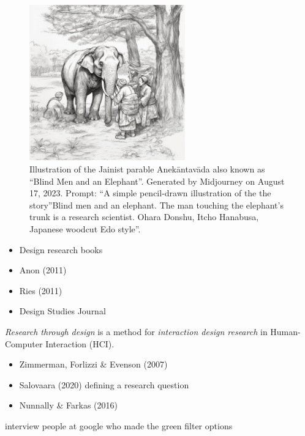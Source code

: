 \documentclass[
  letterpaper,
  DIV=11,
  numbers=noendperiod]{scrartcl}
\providecommand{\tightlist}{%
  \setlength{\itemsep}{0pt}\setlength{\parskip}{0pt}}\usepackage{longtable,booktabs,array}
\begin{document}
\begin{figure}[H]

{\centering \includegraphics[width=0.6\textwidth,height=\textheight]{./images/discussion/elephant.png}

}

\caption{Illustration of the Jainist parable Anekāntavāda also known as
``Blind Men and an Elephant''. Generated by Midjourney on August 17,
2023. Prompt: ``A simple pencil-drawn illustration of the the
story''Blind men and an elephant. The man touching the elephant's trunk
is a research scientist. Ohara Donshu, Itcho Hanabusa, Japanese woodcut
Edo style''.}

\end{figure}%

\begin{itemize}
\tightlist
\item
  Design research books
\item
  Anon (2011)
\item
  Ries (2011)
\item
  Design Studies Journal
\end{itemize}

\emph{Research through design} is a method for \emph{interaction design
research} in Human-Computer Interaction (HCI).

\begin{itemize}
\item
  Zimmerman, Forlizzi \& Evenson (2007)
\item
  Salovaara (2020) defining a research question
\item
  Nunnally \& Farkas (2016)
\end{itemize}

interview people at google who made the green filter options
\end{document}
